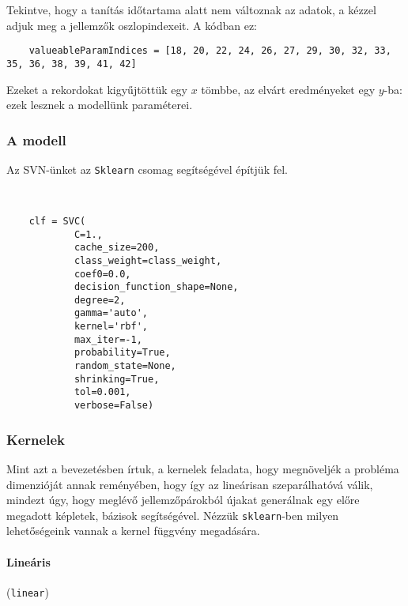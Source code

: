Tekintve, hogy a tanítás időtartama alatt nem változnak az adatok, a kézzel adjuk
meg a jellemzők oszlopindexeit. A kódban ez:
\begin{lstlisting}  
	valueableParamIndices = [18, 20, 22, 24, 26, 27, 29, 30, 32, 33, 35, 36, 38, 39, 41, 42]
\end{lstlisting}

Ezeket a rekordokat kigyűjtöttük egy $ x $ tömbbe, az elvárt eredményeket egy $ y $-ba:
ezek lesznek a modellünk paraméterei.



\subsubsection{A modell}

Az SVN-ünket az \texttt{Sklearn} csomag segítségével építjük fel. 


\begin{lstlisting}  


	clf = SVC(
			C=1., 
			cache_size=200, 
			class_weight=class_weight, 
			coef0=0.0,
			decision_function_shape=None, 
			degree=2, 
			gamma='auto', 
			kernel='rbf',
			max_iter=-1,
			probability=True, 
			random_state=None, 
			shrinking=True,
			tol=0.001, 
			verbose=False)

\end{lstlisting}




\subsubsection{Kernelek}


Mint azt a bevezetésben írtuk, a kernelek feladata, hogy megnöveljék a probléma
dimenzióját annak reményében, hogy így az lineárisan szeparálhatóvá válik, mindezt 
úgy, hogy meglévő jellemzőpárokból újakat generálnak egy előre megadott képletek,
bázisok segítségével. Nézzük \texttt{sklearn}-ben milyen lehetőségeink vannak a 
kernel függvény megadására.


\paragraph{Lineáris} (\texttt{linear})

